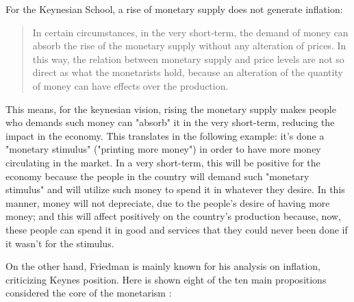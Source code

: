 \documentclass[12pt,a4paper,twoside]{book}
\begin{document}
For the Keynesian School, a rise of monetary supply does not generate inflation:

\begin{quotation}
In certain circumstances, in the very short-term, the demand of money can absorb the rise of the monetary supply without any alteration of prices. In this way, the relation between monetary supply and price levels are not so direct as what the monetarists hold, because an alteration of the quantity of money can have effects over the production. \cite[p. 300]{mochobeker}
\end{quotation}

This means, for the keynesian vision, rising the monetary supply makes people who demands such money can "absorb" it in the very short-term, reducing the impact in the economy. This translates in the following example: it's done a "monetary stimulus" ("printing more money") in order to have more money circulating in the market. In a very short-term, this will be positive for the economy because the people in the country will demand such "monetary stimulus" and will utilize such money to spend it in whatever they desire. In this manner, money will not depreciate, due to the people's desire of having more money; and this will affect positively on the country's production because, now, these people can spend it in good and services that they could never been done if it wasn't for the stimulus.

On the other hand, Friedman is mainly known for his analysis on inflation, criticizing Keynes position. Here is shown eight of the ten main propositions considered the core of the monetarism \cite[pp. 36-37]{friedman:strike}:
\end{document}
